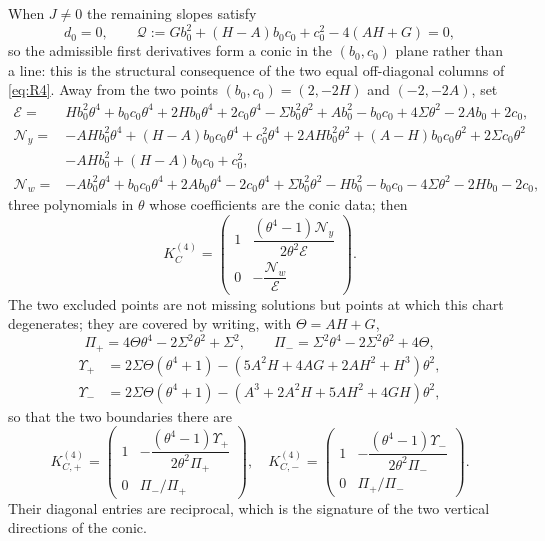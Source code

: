\documentclass[11pt,reqno]{amsart}
\theoremstyle{plain}
\theoremstyle{definition}
\theoremstyle{remark}
\numberwithin{equation}{section}
\begin{document}
When $J\ne0$ the remaining slopes satisfy
\begin{equation}
d_0=0,\qquad
\mathcal Q:=Gb_0^2+(H-A)b_0c_0+c_0^2-4(AH+G)=0,   \label{eq:C4-conic}
\end{equation}
so the admissible first derivatives form a conic in the $(b_0,c_0)$ plane rather
than a line: this is the structural consequence of the two equal off-diagonal
columns of \cref{eq:R4}. Away from the two points
$(b_0,c_0)=(2,-2H)$ and $(-2,-2A)$, set
\begin{align}
\mathcal E={}&Hb_0^2\theta^4+b_0c_0\theta^4+2Hb_0\theta^4+2c_0\theta^4
-\Sigma b_0^2\theta^2+Ab_0^2-b_0c_0+4\Sigma\theta^2-2Ab_0+2c_0,\nonumber\\
\mathcal N_y={}&-AHb_0^2\theta^4+(H-A)b_0c_0\theta^4+c_0^2\theta^4
+2AHb_0^2\theta^2+(A-H)b_0c_0\theta^2+2\Sigma c_0\theta^2\nonumber\\
&-AHb_0^2+(H-A)b_0c_0+c_0^2,\nonumber\\
\mathcal N_w={}&-Ab_0^2\theta^4+b_0c_0\theta^4+2Ab_0\theta^4-2c_0\theta^4
+\Sigma b_0^2\theta^2-Hb_0^2-b_0c_0-4\Sigma\theta^2-2Hb_0-2c_0,
\label{eq:C4-conic-aux}
\end{align}
three polynomials in $\theta$ whose coefficients are the conic data; then
\begin{equation}
K_C^{(4)}=\begin{pmatrix}
1&\dfrac{(\theta^4-1)\mathcal N_y}{2\theta^2\mathcal E}\\[2mm]
0&-\dfrac{\mathcal N_w}{\mathcal E}
\end{pmatrix}.                                      \label{eq:C4-conic-template}
\end{equation}
The two excluded points are not missing solutions but points at which this chart
degenerates; they are covered by writing, with $\Theta=AH+G$,
\begin{equation}
\Pi_+=4\Theta\theta^4-2\Sigma^2\theta^2+\Sigma^2,\qquad
\Pi_-=\Sigma^2\theta^4-2\Sigma^2\theta^2+4\Theta,
\label{eq:C4-Pi}
\end{equation}
\begin{align}
\Upsilon_+&=2\Sigma\Theta(\theta^4+1)-(5A^2H+4AG+2AH^2+H^3)\theta^2,\nonumber\\
\Upsilon_-&=2\Sigma\Theta(\theta^4+1)-(A^3+2A^2H+5AH^2+4GH)\theta^2,
\label{eq:C4-Upsilon}
\end{align}
so that the two boundaries there are
\begin{equation}
K_{C,+}^{(4)}=\begin{pmatrix}1&-\dfrac{(\theta^4-1)\Upsilon_+}{2\theta^2\Pi_+}\\
0&\Pi_-/\Pi_+\end{pmatrix},
\quad
K_{C,-}^{(4)}=\begin{pmatrix}1&-\dfrac{(\theta^4-1)\Upsilon_-}{2\theta^2\Pi_-}\\
0&\Pi_+/\Pi_-\end{pmatrix}.
                                                               \label{eq:C4-vertical}
\end{equation}
Their diagonal entries are reciprocal, which is the signature of the two vertical
directions of the conic.
\end{document}
